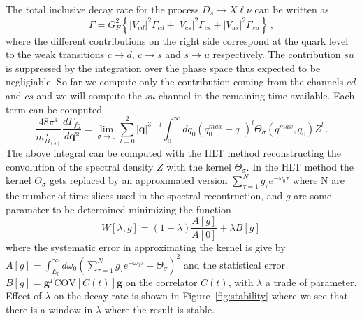 \documentclass [a4paper, 11pt]{article}
\begin{document}
The total inclusive decay rate for the
process $D_s \to X\ell\nu$ can be written as
\begin{equation}
	\Gamma = G^2_F\left\{ |V_{cd} |^2 \Gamma_{cd} + |V_{cs} |^2 \Gamma_{cs} + |V_{us} |^2 \Gamma_{su}
	\right\}\,,
\end{equation}
where the different contributions on the right side correspond at the quark level to the weak
transitions $c \to d$, $c \to s$ and $s \to u$ respectively.
The contribution $su$ is suppressed by the integration over the phase space thus expected to be negligiable. So far we compute only the contribution coming from the channels $cd$ and $cs$ and
we will compute the $su$ channel in the remaining time available.
Each term can be computed
\begin{equation}
	\frac{48 \pi^4}{m_{B_{(s)}}^5}\frac{d\Gamma_{fg}}{d \bm{ q^2} }
	=\lim_{\sigma\to 0}\sum_{l=0}^2 |\bm{q}|^{3-l}\int_0^{\infty}d q_0 (q^{max}_0-q_0)^l\Theta_\sigma(q_0^{max},q_0) Z^l\,.
	\label{eq:gamma}
\end{equation}
The above integral can be computed with the HLT method \cite{Hansen:2019idp} reconstructing the
convolution of the spectral
density $Z$  with the kernel $\Theta_\sigma$.
In the HLT method the kernel $\Theta_\sigma$ gets replaced by an approximated version $\sum_{\tau=1}^Ng_\tau e^{-\omega_0\tau}$ where N are the number of time slices used in the spectral recontruction, and $g$ are some parameter to be determined minimizing the function
\begin{equation}
	W[\lambda, g]=(1-\lambda)\frac{A[g]}{A[0]}+\lambda B[g]\,
	\label{eq:W_HLT}
\end{equation}
where
the systematic error in approximating the kernel  is give by
$A[g]=\int_{E_0}^\infty d \omega_0( \sum_{\tau=1}^N g_\tau e^{-\omega_0\tau}- \Theta_\sigma )^2$
and the statistical error $B[g]=\bm{g}^T \mbox{COV}[C(t)]\bm{g}$ on the correlator $C(t)$, with $\lambda$ a trade of parameter. Effect of $\lambda$ on the decay rate is shown in Figure~\ref{fig:stability} where we see that there is a window in $\lambda$ where the result is stable.
\end{document}
